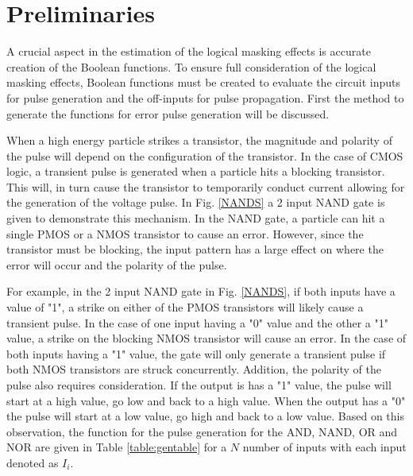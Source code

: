 \section{Preliminaries} \label{ch3:prelim}

A crucial aspect in the estimation of the logical masking effects is accurate creation of the Boolean functions. To ensure full consideration of the logical masking effects, Boolean functions must be created to evaluate the circuit inputs for pulse generation and the off-inputs for pulse propagation. First the method to generate the functions for error pulse generation will be discussed. 

When a high energy particle strikes a transistor, the magnitude and polarity of the pulse will depend on the configuration of the transistor. In the case of CMOS logic, a transient pulse is generated when a particle hits a blocking transistor. This will, in turn cause the transistor to temporarily conduct current allowing for the generation of the voltage pulse. In Fig. \ref{NANDS} a 2 input NAND gate is given to demonstrate this mechanism. In the NAND gate, a particle can hit a single PMOS or a NMOS transistor to cause an error. However, since the transistor must be blocking, the input pattern has a large effect on where the error will occur and the polarity of the pulse. 

For example, in the 2 input NAND gate in Fig. \ref{NANDS}, if both inputs have a value of "1", a strike on either of the PMOS transistors will likely cause a transient pulse. In the case of one input having a "0" value and the other a "1" value,  a strike on the blocking NMOS transistor will cause an error. In the case of both inputs having a "1" value, the gate will only generate a transient pulse if both NMOS transistors are struck concurrently. Addition, the polarity of the pulse also requires consideration. If the output is has a "1" value, the pulse will start at a high value, go low and back to a high value. When the output has a "0" the pulse will start at a low value, go high and back to a low value. Based on this observation, the function for the pulse generation for the AND, NAND, OR and NOR are given in Table \ref{table:gentable} for a $N$ number of inputs with each input denoted as $I_i$.

